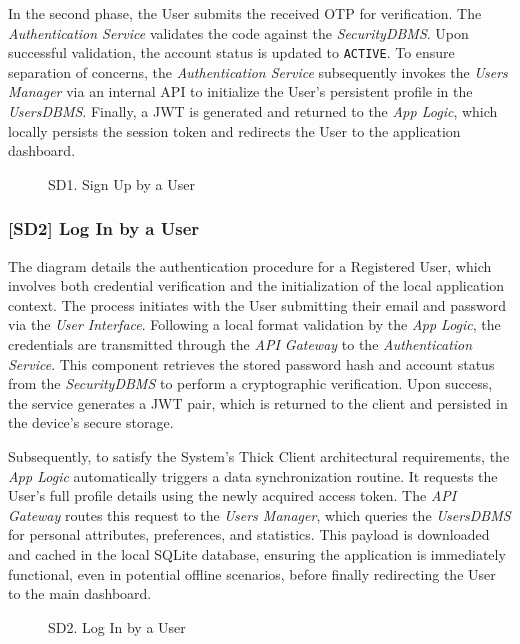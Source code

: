 In the second phase, the User submits the received OTP for verification. The \emph{Authentication Service} validates the code against the \emph{SecurityDBMS}. Upon successful validation, the account status is updated to \texttt{ACTIVE}. To ensure separation of concerns, the \emph{Authentication Service} subsequently invokes the \emph{Users Manager} via an internal API to initialize the User's persistent profile in the \emph{UsersDBMS}. Finally, a JWT is generated and returned to the \emph{App Logic}, which locally persists the session token and redirects the User to the application dashboard.

\begin{figure}[hp]
    \centering
    
    \caption{SD1. Sign Up by a User}
    \label{fig:SD1}
\end{figure}
\newpage
\subsubsection*{[SD2] Log In by a User}
The diagram details the authentication procedure for a Registered User, which involves both credential verification and the initialization of the local application context. The process initiates with the User submitting their email and password via the \emph{User Interface}. Following a local format validation by the \emph{App Logic}, the credentials are transmitted through the \emph{API Gateway} to the \emph{Authentication Service}. This component retrieves the stored password hash and account status from the \emph{SecurityDBMS} to perform a cryptographic verification. Upon success, the service generates a JWT pair, which is returned to the client and persisted in the device's secure storage.

Subsequently, to satisfy the System's Thick Client architectural requirements, the \emph{App Logic} automatically triggers a data synchronization routine. It requests the User's full profile details using the newly acquired access token. The \emph{API Gateway} routes this request to the \emph{Users Manager}, which queries the \emph{UsersDBMS} for personal attributes, preferences, and statistics. This payload is downloaded and cached in the local SQLite database, ensuring the application is immediately functional, even in potential offline scenarios, before finally redirecting the User to the main dashboard.

\vspace{1cm}
\begin{figure}[H]
    \centering
    
    \caption{SD2. Log In by a User}
    \label{fig:SD2}
\end{figure}
\newpage
